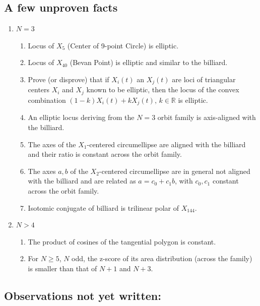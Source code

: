 \documentclass[]{article}
\providecommand{\tightlist}{%
  \setlength{\itemsep}{0pt}\setlength{\parskip}{0pt}}
\begin{document}
\hypertarget{a-few-unproven-facts}{%
\subsection{A few unproven facts}\label{a-few-unproven-facts}}

\begin{enumerate}
\def\labelenumi{\arabic{enumi}.}
\tightlist
\item
  \(N=3\)

  \begin{enumerate}
  \def\labelenumii{\arabic{enumii}.}
  \tightlist
  \item
    Locus of \(X_5\) (Center of 9-point Circle) is elliptic.
  \item
    Locus of \(X_{40}\) (Bevan Point) is elliptic and similar to the billiard.
  \item
    Prove (or disprove) that if \(X_i(t)\) an \(X_j(t)\) are loci of triangular centers \(X_i\) and \(X_j\) known to be elliptic, then the locus of the convex combination \((1-k) X_i(t)+k X_j(t),\,k\in\mathbb{R}\) is elliptic.
  \item
    An elliptic locus deriving from the \(N=3\) orbit family is axis-aligned with the billiard.
  \item
    The axes of the \(X_1\)-centered circumellipse are aligned with the billiard and their ratio is constant across the orbit family.
  \item
    The axes \(a,b\) of the \(X_2\)-centered circumellipse are in general not aligned with the billiard and are related as \(a=c_0 + c_1 b\), with \(c_0,c_1\) constant across the orbit family.
  \item
    Isotomic conjugate of billiard is trilinear polar of \(X_{144}\).
  \end{enumerate}
\item
  \(N>4\)

  \begin{enumerate}
  \def\labelenumii{\arabic{enumii}.}
  \tightlist
  \item
    The product of cosines of the tangential polygon is constant.
  \item
    For \(N\geq5\), \(N\) odd, the z-score of its area distribution (across the family) is smaller than that of \(N+1\) and \(N+3\).
  \end{enumerate}
\end{enumerate}

\hypertarget{observations-not-yet-written}{%
\subsection{Observations not yet written:}\label{observations-not-yet-written}}
\end{document}
